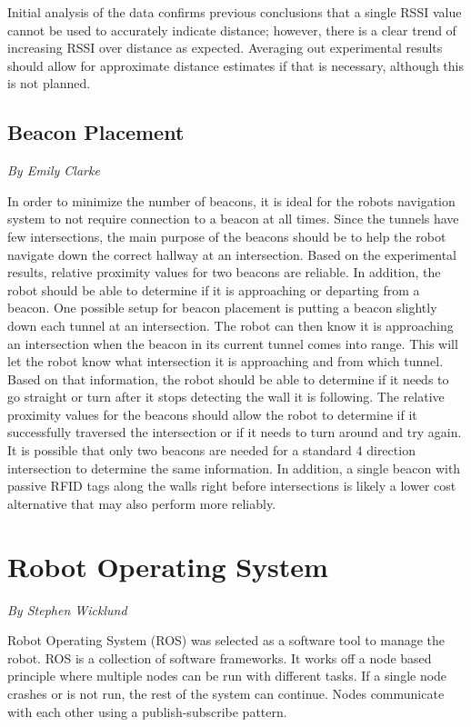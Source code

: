 \documentclass[12pt]{report}
\newcommand{\sectionAuthor}[1]{{\small\vspace{-1em}\textit{#1}}\bigskip\par}
\begin{document}
Initial analysis of the data confirms previous conclusions that a single RSSI value cannot be used to accurately indicate distance; however, there is a clear trend of increasing RSSI over distance as expected. Averaging out experimental results should allow for approximate distance estimates if that is necessary, although this is not planned.

\subsection{Beacon Placement}
\sectionAuthor{By Emily Clarke}
In order to minimize the number of beacons, it is ideal for the robots navigation system to not require connection to a beacon at all times. Since the tunnels have few intersections, the main purpose of the beacons should be to help the robot navigate down the correct hallway at an intersection. Based on the experimental results, relative proximity values for two beacons are reliable. In addition, the robot should be able to determine if it is approaching or departing from a beacon. One possible setup for beacon placement is putting a beacon slightly down each tunnel at an intersection. The robot can then know it is approaching an intersection when the beacon in its current tunnel comes into range. This will let the robot know what intersection it is approaching and from which tunnel. Based on that information, the robot should be able to determine if it needs to go straight or turn after it stops detecting the wall it is following. The relative proximity values for the beacons should allow the robot to determine if it successfully traversed the intersection or if it needs to turn around and try again. It is possible that only two beacons are needed for a standard 4 direction intersection to determine the same information. In addition, a single beacon with passive RFID tags along the walls right before intersections is likely a lower cost alternative that may also perform more reliably.

\section{Robot Operating System}
\sectionAuthor{By Stephen Wicklund}
Robot Operating System (ROS) was selected as a software tool to manage the robot. ROS is a collection of software frameworks. It works off a node based principle where multiple nodes can be run with different tasks. If a single node crashes or is not run, the rest of the system can continue. Nodes communicate with each other using a publish-subscribe pattern.
\end{document}
